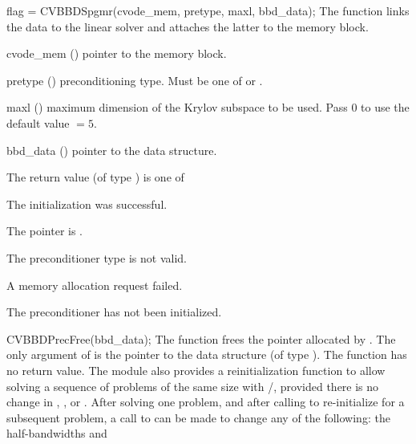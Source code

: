 {
  flag = CVBBDSpgmr(cvode\_mem, pretype, maxl, bbd\_data);
}
{
  The function  links the {\cvbbdpre} data to the
  {\cvspgmr} linear solver and attaches the latter to the {\cvode}
  memory block.
}
{
  \begin{args}
  \item[cvode\_mem] ()
    pointer to the {\cvode} memory block.
  \item[pretype] ()
    preconditioning type. Must be one of  or .
  \item[maxl] ()
    maximum dimension of the Krylov subspace to be used. Pass $0$ to use the 
    default value $=5$.
  \item[bbd\_data] ()
    pointer to the {\cvbbdpre} data structure.
  \end{args}
}
{
  The return value  (of type ) is one of
  \begin{args}
  \item[\Id{CVSPGMR\_SUCCESS}] 
    The {\cvspgmr} initialization was successful.
  \item[\Id{CVSPGMR\_MEM\_NULL}]
    The  pointer is .
  \item[\Id{CVSPGMR\_ILL\_INPUT}]
    The preconditioner type  is not valid.
  \item[\Id{CVSPGMR\_MEM\_FAIL}]
    A memory allocation request failed.
  \item[\Id{CV\_PDATA\_NULL}]
    The {\cvbbdpre} preconditioner has not been initialized.
  \end{args}
}
{}
{
  CVBBDPrecFree(bbd\_data);
}
{
  The function  frees the pointer allocated by
  .
}
{
  The only argument of  is the pointer to the {\cvbbdpre} 
  data structure (of type ).
}
{
  The function  has no return value.
}
{}
The {\cvbbdpre} module also provides a reinitialization function to allow
solving  a sequence of problems of the same size with {\cvspgmr}/{\cvbbdpre},
provided there is no change in , , or .
After solving one problem, and after calling  to re-initialize 
{\cvode} for a subsequent problem, a call to  can be made
to change any of the following: the half-bandwidths  and  
